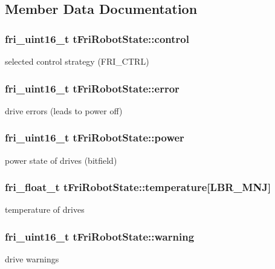 \subsection{\-Member \-Data \-Documentation}
\hypertarget{structtFriRobotState_ac065a510edb28a2550c0c29b5d32ca96}{
\subsubsection[{control}]{\setlength{\rightskip}{0pt plus 5cm}fri\-\_\-uint16\-\_\-t {\bf t\-Fri\-Robot\-State\-::control}}}\label{structtFriRobotState_ac065a510edb28a2550c0c29b5d32ca96}
selected control strategy (\-F\-R\-I\-\_\-\-C\-T\-R\-L) \hypertarget{structtFriRobotState_ac66330e631157aacfa332273f3e65240}{
\subsubsection[{error}]{\setlength{\rightskip}{0pt plus 5cm}fri\-\_\-uint16\-\_\-t {\bf t\-Fri\-Robot\-State\-::error}}}\label{structtFriRobotState_ac66330e631157aacfa332273f3e65240}
drive errors (leads to power off) \hypertarget{structtFriRobotState_ab8976cd187b764798006f9e65899d175}{
\subsubsection[{power}]{\setlength{\rightskip}{0pt plus 5cm}fri\-\_\-uint16\-\_\-t {\bf t\-Fri\-Robot\-State\-::power}}}\label{structtFriRobotState_ab8976cd187b764798006f9e65899d175}
power state of drives (bitfield) \hypertarget{structtFriRobotState_af5bafdd66167ca5a93485367d23142a8}{
\subsubsection[{temperature}]{\setlength{\rightskip}{0pt plus 5cm}fri\-\_\-float\-\_\-t {\bf t\-Fri\-Robot\-State\-::temperature}\mbox{[}{\bf \-L\-B\-R\-\_\-\-M\-N\-J}\mbox{]}}}\label{structtFriRobotState_af5bafdd66167ca5a93485367d23142a8}
temperature of drives \hypertarget{structtFriRobotState_aea8124af0ebd5daeb835d6c69330169f}{
\subsubsection[{warning}]{\setlength{\rightskip}{0pt plus 5cm}fri\-\_\-uint16\-\_\-t {\bf t\-Fri\-Robot\-State\-::warning}}}\label{structtFriRobotState_aea8124af0ebd5daeb835d6c69330169f}
drive warnings 

